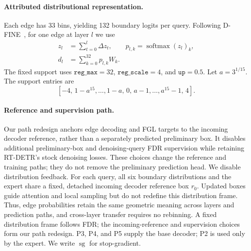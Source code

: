\paragraph{Attributed distributional representation.}
Each edge has 33 bins, yielding 132 boundary logits per query. Following D-FINE~\cite{peng2025dfine}, for one edge at layer $l$ we use
\begin{equation}
\begin{aligned}
z_l&=\sum_{t=0}^{l}\Delta z_t,\qquad
p_{l,k}=\operatorname{softmax}(z_l)_k,\\
d_l&=\sum_{k=0}^{32}p_{l,k}W_k .
\end{aligned}
\label{eq:distribution}
\end{equation}
The fixed support uses $\texttt{reg\_max}=32$, $\texttt{reg\_scale}=4$, and $\texttt{up}=0.5$. Let $a=3^{1/15}$. The support entries are
\[
[-4,\,1-a^{15},\ldots,1-a,\,0,\,a-1,\ldots,a^{15}-1,\,4].
\]
\paragraph{Reference and supervision path.}
Our path redesign anchors edge decoding and FGL targets to the incoming decoder reference, rather than a separately predicted preliminary box. It disables additional preliminary-box and denoising-query FDR supervision while retaining RT-DETR's stock denoising losses. These choices change the reference and training paths; they do not remove the preliminary prediction head. We disable distribution feedback. For each query, all six boundary distributions and the expert share a fixed, detached incoming decoder reference box $r_0$. Updated boxes guide attention and local sampling but do not redefine this distribution frame. Thus, edge probabilities retain the same geometric meaning across layers and prediction paths, and cross-layer transfer requires no rebinning. A fixed distribution frame follows FDR; the incoming-reference and supervision choices form our path redesign. P3, P4, and P5 supply the base decoder; P2 is used only by the expert. We write $\operatorname{sg}$ for stop-gradient.

